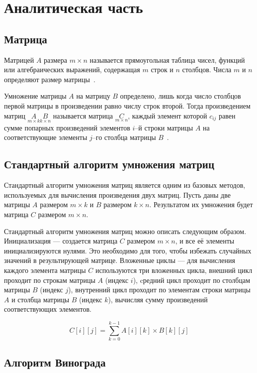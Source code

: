\chapter{Аналитическая часть}
\section{Матрица}

Матрицей $A$ размера $m \times n$ называется прямоугольная таблица чисел, функций или алгебраических выражений, содержащая $m$ строк и $n$ столбцов. Числа $m$ и $n$ определяют размер матрицы~\cite{Belousov2006}.

Умножение матрицы $A$ на матрицу $B$ определено, лишь когда число столбцов первой матрицы в произведении равно числу строк второй. Тогда произведением матриц $\underset{m \times k}{A} \underset{k \times n}{B}$ называется матрица $\underset{m \times n}{C}$, каждый элемент которой $c_{ij}$ равен сумме попарных произведений элементов $i$–й строки матрицы $A$ на соответствующие элементы $j$–го столбца матрицы $B$~\cite{Belousov2006}.

\section{Стандартный алгоритм умножения матриц}

Стандартный алгоритм умножения матриц является одним из базовых методов, используемых для вычисления произведения двух матриц. Пусть даны две матрицы $A$ размером $m \times k$ и $B$ размером $k \times n$. Результатом их умножения будет матрица $C$ размером $m \times n$.

Стандартный алгоритм умножения матриц можно описать следующим образом. Инициализация --- создается матрица $C$ размером $m \times n$, и все её элементы инициализируются нулями. Это необходимо для того, чтобы избежать случайных значений в результирующей матрице. Вложенные циклы --- для вычисления каждого элемента матрицы $C$ используются три вложенных цикла, 
внешний цикл проходит по строкам матрицы $A$ (индекс $i$), 
cредний цикл проходит по столбцам матрицы $B$ (индекс $j$), 
внутренний цикл проходит по элементам строки матрицы $A$ и столбца матрицы $B$ (индекс $k$), вычисляя сумму произведений соответствующих элементов.

\begin{equation}
	\label{eq:std}
	C[i][j] = \sum_{k=0}^{k-1} A[i][k] \times B[k][j]
\end{equation}


\section{Алгоритм Винограда}

